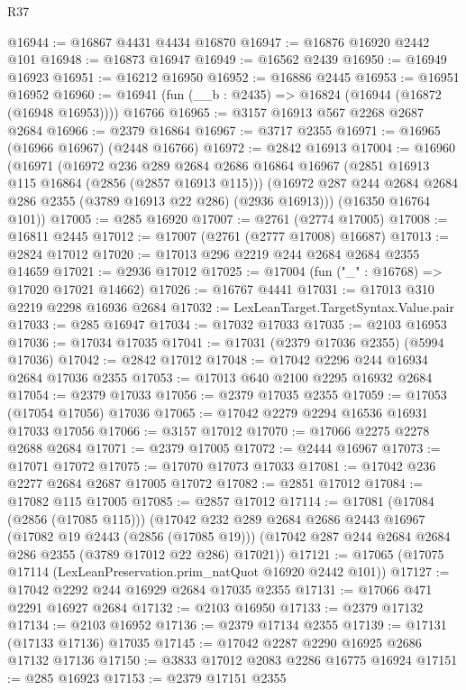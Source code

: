 \begin{lexlean}{R37}
\begin{coremodule}
@16944 := @16867 @4431 @4434 @16870
@16947 := @16876 @16920 @2442 @101
@16948 := @16873 @16947
@16949 := @16562 @2439
@16950 := @16949 @16923
@16951 := @16212 @16950
@16952 := @16886 @2445
@16953 := @16951 @16952
@16960 := @16941 (fun (__b : @2435) => @16824 (@16944 (@16872 (@16948 @16953)))) @16766
@16965 := @3157 @16913 @567 @2268 @2687 @2684
@16966 := @2379 @16864
@16967 := @3717 @2355
@16971 := @16965 (@16966 @16967) (@2448 @16766)
@16972 := @2842 @16913
@17004 := @16960
    (@16971
      (@16972
        @236
        @289
        @2684
        @2686
        @16864
        @16967
        (@2851 @16913 @115 @16864 (@2856 (@2857 @16913 @115)))
        (@16972 @287 @244 @2684 @2684 @286 @2355 (@3789 @16913 @22 @286) (@2936 @16913)))
      (@16350 @16764 @101))
@17005 := @285 @16920
@17007 := @2761 (@2774 @17005)
@17008 := @16811 @2445
@17012 := @17007 (@2761 (@2777 @17008) @16687)
@17013 := @2824 @17012
@17020 := @17013 @296 @2219 @244 @2684 @2684 @2355 @14659
@17021 := @2936 @17012
@17025 := @17004 (fun ("_" : @16768) => @17020 @17021 @14662)
@17026 := @16767 @4441
@17031 := @17013 @310 @2219 @2298 @16936 @2684
@17032 := LexLeanTarget.TargetSyntax.Value.pair
@17033 := @285 @16947
@17034 := @17032 @17033
@17035 := @2103 @16953
@17036 := @17034 @17035
@17041 := @17031 (@2379 @17036 @2355) (@5994 @17036)
@17042 := @2842 @17012
@17048 := @17042 @2296 @244 @16934 @2684 @17036 @2355
@17053 := @17013 @640 @2100 @2295 @16932 @2684
@17054 := @2379 @17033
@17056 := @2379 @17035 @2355
@17059 := @17053 (@17054 @17056) @17036
@17065 := @17042 @2279 @2294 @16536 @16931 @17033 @17056
@17066 := @3157 @17012
@17070 := @17066 @2275 @2278 @2688 @2684
@17071 := @2379 @17005
@17072 := @2444 @16967
@17073 := @17071 @17072
@17075 := @17070 @17073 @17033
@17081 := @17042 @236 @2277 @2684 @2687 @17005 @17072
@17082 := @2851 @17012
@17084 := @17082 @115 @17005
@17085 := @2857 @17012
@17114 := @17081
    (@17084 (@2856 (@17085 @115)))
    (@17042
      @232
      @289
      @2684
      @2686
      @2443
      @16967
      (@17082 @19 @2443 (@2856 (@17085 @19)))
      (@17042 @287 @244 @2684 @2684 @286 @2355 (@3789 @17012 @22 @286) @17021))
@17121 := @17065 (@17075 @17114 (LexLeanPreservation.prim_natQuot @16920 @2442 @101))
@17127 := @17042 @2292 @244 @16929 @2684 @17035 @2355
@17131 := @17066 @471 @2291 @16927 @2684
@17132 := @2103 @16950
@17133 := @2379 @17132
@17134 := @2103 @16952
@17136 := @2379 @17134 @2355
@17139 := @17131 (@17133 @17136) @17035
@17145 := @17042 @2287 @2290 @16925 @2686 @17132 @17136
@17150 := @3833 @17012 @2083 @2286 @16775 @16924
@17151 := @285 @16923
@17153 := @2379 @17151 @2355

\end{coremodule}
\end{lexlean}
